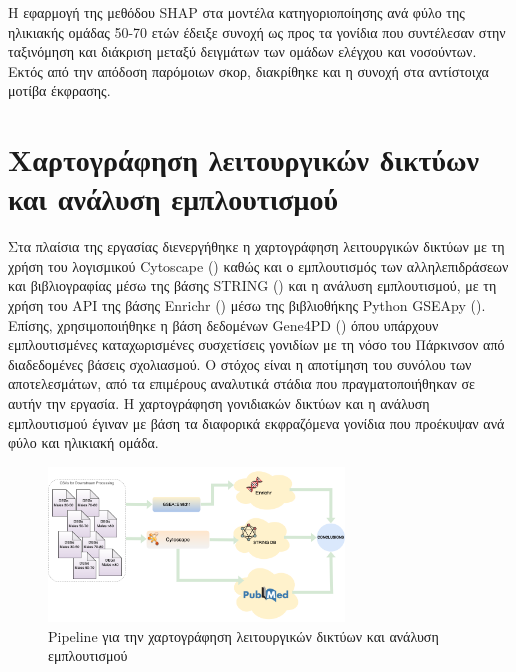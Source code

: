 \documentclass[12pt]{report}
\begin{document}
        \par
            Η εφαρμογή της μεθόδου SHAP στα μοντέλα κατηγοριοποίησης ανά φύλο της ηλικιακής ομάδας 50-70 ετών έδειξε συνοχή ως προς τα γονίδια που συντέλεσαν στην ταξινόμηση και διάκριση μεταξύ δειγμάτων των ομάδων ελέγχου και νοσούντων. Εκτός από την απόδοση παρόμοιων σκορ, διακρίθηκε και η συνοχή στα αντίστοιχα μοτίβα έκφρασης.

    \section{Χαρτογράφηση λειτουργικών δικτύων και ανάλυση εμπλουτισμού}
            Στα πλαίσια της εργασίας διενεργήθηκε η χαρτογράφηση λειτουργικών δικτύων με τη χρήση του λογισμικού Cytoscape (\emph{\cite{Shannon2003Cytoscape:Networks}}) καθώς και ο εμπλουτισμός των αλληλεπιδράσεων και βιβλιογραφίας μέσω της βάσης STRING (\emph{\cite{Szklarczyk2023TheInterest}})  και η ανάλυση εμπλουτισμού, με τη χρήση του API  της βάσης Enrichr (\emph{\cite{Chen2013Enrichr:Tool}}) μέσω της βιβλιοθήκης Python GSEApy (\emph{\cite{Fang2023GSEApy:Python}}). Επίσης, χρησιμοποιήθηκε η βάση δεδομένων Gene4PD (\emph{\cite{Li2021Gene4PD:Disease}}) όπου υπάρχουν εμπλουτισμένες καταχωρισμένες συσχετίσεις γονιδίων με τη νόσο του Πάρκινσον από διαδεδομένες βάσεις σχολιασμού. Ο στόχος είναι η αποτίμηση του συνόλου των αποτελεσμάτων, από τα επιμέρους αναλυτικά στάδια που πραγματοποιήθηκαν σε αυτήν την εργασία. Η χαρτογράφηση γονιδιακών δικτύων και η ανάλυση εμπλουτισμού έγιναν με βάση τα διαφορικά εκφραζόμενα γονίδια που προέκυψαν ανά φύλο και ηλικιακή ομάδα.

            \begin{figure}[H]
                \centering
                \includegraphics[width=0.7\textwidth]{GSEA/msci-big-pic-GSEA-blocks.png}
                \caption{Pipeline για την χαρτογράφηση λειτουργικών δικτύων και ανάλυση εμπλουτισμού}
                \label{fig:msci-big-pic-GSEA-blocks}
            \end{figure}
    
\end{document}
